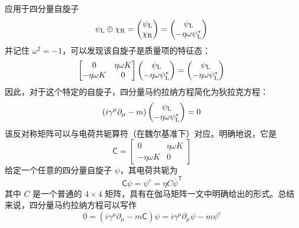 应用于四分量自旋子
\[
\psi_{\rm{L}} \oplus \chi_{\rm{R}} = \begin{pmatrix} \psi_{\rm{L}} \\ \chi_{\rm{R}} \end{pmatrix} = \begin{pmatrix} \psi_{\rm{L}} \\ -\eta \omega \psi_{\rm{L}}^{*} \end{pmatrix}~
\]
并记住 \( \omega^2 = -1 \)，可以发现该自旋子是质量项的特征态：
\[
\begin{bmatrix} 0 & \eta \omega K \\ -\eta \omega K & 0 \end{bmatrix} \begin{pmatrix} \psi_{\rm{L}} \\ -\eta \omega \psi_{\rm{L}}^{*} \end{pmatrix} = \begin{pmatrix} \psi_{\rm{L}} \\ -\eta \omega \psi_{\rm{L}}^{*} \end{pmatrix}~
\]
因此，对于这个特定的自旋子，四分量马约拉纳方程简化为狄拉克方程：
\[
\left(i \gamma^{\mu} \partial_{\mu} - m \right) \begin{pmatrix} \psi_{\rm{L}} \\ -\eta \omega \psi_{\rm{L}}^{*} \end{pmatrix} = 0~
\]
该反对称矩阵可以与电荷共轭算符（在魏尔基准下）对应。明确地说，它是
\[
\mathsf{C} = \begin{bmatrix} 0 & \eta \omega K \\ -\eta \omega K & 0 \end{bmatrix}~
\]
给定一个任意的四分量自旋子 \(\psi\)，其电荷共轭为
\[
\mathsf{C} \psi = \psi^{c} = \eta C {\overline{\psi}}^{\textsf{T}}~
\]
其中 \(C\) 是一个普通的 \(4 \times 4\) 矩阵，具有在伽马矩阵一文中明确给出的形式。总结来说，四分量马约拉纳方程可以写作
\[
0 = \left(i \gamma^{\mu} \partial_{\mu} - m \mathsf{C} \right) \psi = i \gamma^{\mu} \partial_{\mu} \psi - m \psi^{c}~
\]
